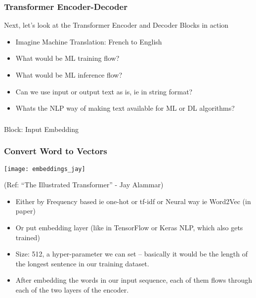 \begin{frame}[fragile]\frametitle{Transformer Encoder-Decoder}
Next, let’s look at the Transformer Encoder and Decoder Blocks in action


      \begin{itemize}
			\item Imagine Machine Translation: French to English
			\item What would be ML training flow?
			\item What would be ML inference flow?
			\item Can we use input or output text as is, ie in string format?
			\item Whats the NLP way of making text available for ML or DL algorithms?
	\end{itemize}
			
\end{frame}

\begin{frame}[fragile]\frametitle{}
\begin{center}
{\Large Block: Input Embedding}
\end{center}
\end{frame}

\begin{frame}[fragile]\frametitle{Convert Word to Vectors}


\begin{center}
\texttt{[image: embeddings\_jay]}


{\tiny (Ref: ``The Illustrated Transformer'' - Jay Alammar)}
\end{center}		


\begin{itemize}
\item Either by Frequency based ie one-hot or tf-idf or Neural way ie Word2Vec (in paper)
\item Or put embedding layer (like in TensorFlow or Keras NLP, which also gets trained)
\item Size: 512, a hyper-parameter we can set – basically it would be the length of the longest sentence in our training dataset.
\item After embedding the words in our input sequence, each of them flows through each of the two layers of the encoder.
\end{itemize}

\end{frame}

